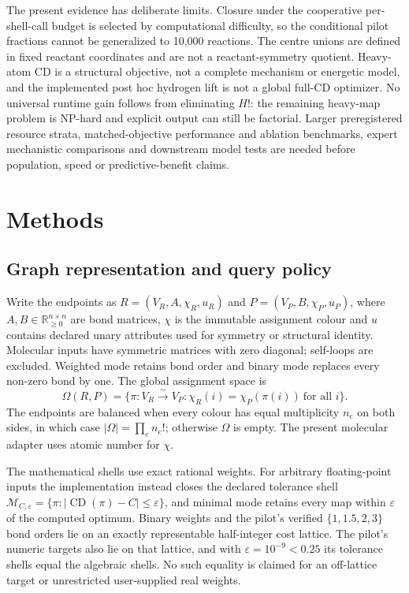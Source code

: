 \documentclass[11pt]{article}
\newcommand{\CD}{\operatorname{CD}}
\begin{document}
The present evidence has deliberate limits.  Closure under the cooperative
per-shell-call budget is selected by computational difficulty, so the conditional
pilot fractions cannot be generalized to 10,000 reactions.  The centre unions
are defined in fixed reactant coordinates and are not a reactant-symmetry
quotient.  Heavy-atom CD is a structural objective, not a complete mechanism
or energetic model, and the implemented post hoc hydrogen lift is not a global
full-CD optimizer.  No universal runtime gain follows from eliminating $H!$:
the remaining heavy-map problem is NP-hard and explicit output can still be
factorial.  Larger preregistered resource strata, matched-objective performance
and ablation benchmarks, expert mechanistic comparisons and downstream model
tests are needed before population, speed or predictive-benefit claims.

\section*{Methods}

\subsection*{Graph representation and query policy}

Write the endpoints as $R=(V_R,A,\chi_R,u_R)$ and
$P=(V_P,B,\chi_P,u_P)$, where $A,B\in\mathbb R_{\geq0}^{n\times n}$ are bond
matrices, $\chi$ is the immutable assignment colour and $u$ contains declared
unary attributes used for symmetry or structural identity.  Molecular inputs
have symmetric matrices with zero diagonal; self-loops are excluded.  Weighted
mode retains bond order and binary mode replaces every non-zero bond by one.
The global assignment space is
\begin{equation}
 \Omega(R,P)=\{\pi:V_R\overset{\sim}{\longrightarrow}V_P:
 \chi_R(i)=\chi_P(\pi(i))\ \text{for all }i\}.
 \label{eq:assignment-space}
\end{equation}
The endpoints are balanced when every colour has equal multiplicity $n_e$ on
both sides, in which case $|\Omega|=\prod_e n_e!$; otherwise $\Omega$ is empty.
The present molecular adapter uses atomic number for $\chi$.

The mathematical shells use exact rational weights.  For arbitrary
floating-point inputs the implementation instead closes the declared
tolerance shell
$\mathcal M_{C,\varepsilon}=\{\pi:|\CD(\pi)-C|\leq\varepsilon\}$, and minimal
mode retains every map within $\varepsilon$ of the computed optimum.  Binary
weights and the pilot's verified $\{1,1.5,2,3\}$ bond orders lie on an exactly
representable half-integer cost lattice.  The pilot's numeric targets also lie
on that lattice, and with $\varepsilon=10^{-9}<0.25$ its tolerance shells equal
the algebraic shells.  No such equality is claimed for an off-lattice target
or unrestricted user-supplied real weights.
\end{document}
